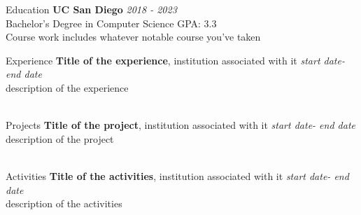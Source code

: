 

	\begin{rSection}{Education}
		{\bf UC San Diego} \hfill {\em 2018 - 2023} 
		\\ Bachelor's Degree in Computer Science\hfill { GPA: 3.3 }
		\\ Course work includes whatever notable course you've taken
		\\

	\end{rSection}
	
	\begin{rSection}{Experience}
		{\bf Title of the experience}{, institution associated with it} \hfill {\em start date- end date}\\
		description of the experience\\\\
	\end{rSection}
	
	\begin{rSection}{Projects}
		{\bf Title of the project}{, institution associated with it} \hfill {\em start date- end date}\\
		description of the project\\\\
	\end{rSection}
	
	\begin{rSection}{Activities}
		{\bf Title of the activities}{, institution associated with it} \hfill {\em start date- end date}\\
		description of the activities\\\\
	\end{rSection}
	
